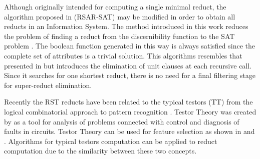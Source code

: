 \documentclass[authoryear,preprint,review,12pt]{elsarticle}
\begin{document}
  Although originally intended for computing a single minimal reduct, the algorithm proposed in \linebreak 
  \citep{Jensen14} (RSAR-SAT) may be modified in order to obtain all reducts in an Information System. 
  The method introduced in this work reduces the problem of finding a reduct from the discernibility function 
  to the SAT problem \citep{Davis62}. The boolean function generated in this way is always satisfied since the
  complete set of attributes is a trivial solution. This algorithms resembles that presented in \citep{Starzyk99}
  but introduces the elimination of unit clauses at each recursive call. Since it searches for one shortest
  reduct, there is no need for a final filtering stage for super-reduct elimination.
    
  Recently the RST reducts have been related to the typical testors (TT) from the logical combinatorial approach 
  to pattern recognition \citep{Lazo15}. Testor Theory was created by \cite{Cheguis55} as a tool for analysis of 
  problems connected with control and diagnosis of faults in circuits. 
  Testor Theory can be used for feature selection as shown in \citep{Ruiz08} and \citep{Martinez01}. 
  Algorithms for typical testors computation can be applied to reduct computation due to the similarity between
  these two concepts. 
  
\end{document}
